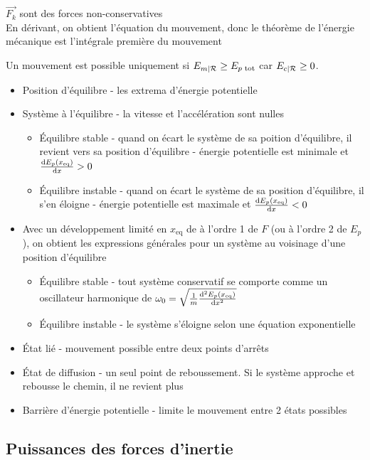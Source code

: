 \documentclass[openany]{book}
\begin{document}
\noindent $\vec{F_k}$ sont des forces non-conservatives \\

\noindent En dérivant, on obtient l'équation du mouvement, donc le théorème de l'énergie mécanique est l'intégrale première du mouvement

\noindent Un mouvement est possible uniquement si $E_{m|\mathcal{R}} \geq E_{p \text{ tot}}$ car $E_{c|\mathcal{R}} \geq 0$.
\begin{itemize}
    \item Position d'équilibre - les extrema d'énergie potentielle
    \item Système à l'équilibre - la vitesse et l'accélération sont nulles 
    \begin{itemize}
        \item Équilibre stable - quand on écart le système de sa poition d'équilibre, il revient vers sa position d'équilibre - énergie potentielle est minimale et $ \frac{\text{d} E_p(x_{\text{eq}})}{\text{d}x} > 0 $
        \item Équilibre instable - quand on écart le système de sa position d'équilibre, il s'en éloigne - énergie potentielle est maximale et $ \frac{\text{d} E_p(x_{\text{eq}})}{\text{d}x} < 0 $
    \end{itemize}
    \item Avec un développement limité en $x_{\text{eq}}$ de à l'ordre 1 de $F$ (ou à l'ordre 2 de $E_p$), on obtient les expressions générales pour un système au voisinage d'une position d'équilibre
    \begin{itemize}
        \item Équilibre stable - tout système conservatif se comporte comme un oscillateur harmonique de $ \omega_0 = \sqrt{\frac{1}{m}\frac{\text{d} ^2 E_p(x_{\text{eq}})}{\text{d}x^2}} $
        \item Équilibre instable - le système s'éloigne selon une équation exponentielle 
    \end{itemize}
    \item État lié - mouvement possible entre deux points d'arrêts
    \item État de diffusion - un seul point de reboussement. Si le système approche et rebousse le chemin, il ne revient plus
    \item Barrière d'énergie potentielle - limite le mouvement entre 2 états possibles
\end{itemize}

\subsection{Puissances des forces d'inertie}
\end{document}
